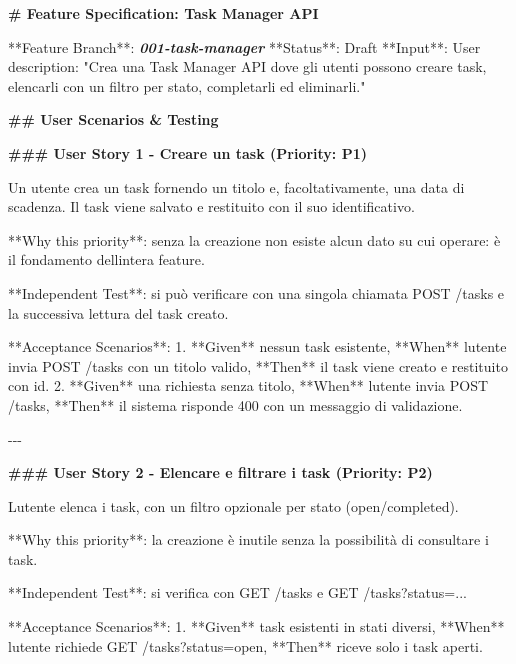 \documentclass[
  italian,
  10pt,
]{book}
\newenvironment{Shaded}{\begin{snugshade}}{\end{snugshade}}
\newcommand{\FunctionTok}[1]{\textcolor[rgb]{0.13,0.29,0.53}{\textbf{#1}}}
\newcommand{\InformationTok}[1]{\textcolor[rgb]{0.56,0.35,0.01}{\textbf{\textit{#1}}}}
\newcommand{\NormalTok}[1]{#1}
\newcommand{\SpecialStringTok}[1]{\textcolor[rgb]{0.31,0.60,0.02}{#1}}
\begin{document}
\begin{Shaded}
\begin{Highlighting}[]
\FunctionTok{\# Feature Specification: Task Manager API}

\NormalTok{**Feature Branch**: }\InformationTok{\textasciigrave{}001{-}task{-}manager\textasciigrave{}}
\NormalTok{**Status**: Draft}
\NormalTok{**Input**: User description: "Crea una Task Manager API dove gli utenti}
\NormalTok{possono creare task, elencarli con un filtro per stato, completarli ed}
\NormalTok{eliminarli."}

\FunctionTok{\#\# User Scenarios \& Testing}

\FunctionTok{\#\#\# User Story 1 {-} Creare un task (Priority: P1)}

\NormalTok{Un utente crea un task fornendo un titolo e, facoltativamente, una data di}
\NormalTok{scadenza. Il task viene salvato e restituito con il suo identificativo.}

\NormalTok{**Why this priority**: senza la creazione non esiste alcun dato su cui}
\NormalTok{operare: è il fondamento dell\textquotesingle{}intera feature.}

\NormalTok{**Independent Test**: si può verificare con una singola chiamata}
\NormalTok{POST /tasks e la successiva lettura del task creato.}

\NormalTok{**Acceptance Scenarios**:}
\SpecialStringTok{1. }\NormalTok{**Given** nessun task esistente, **When** l\textquotesingle{}utente invia POST /tasks}
\NormalTok{   con un titolo valido, **Then** il task viene creato e restituito con id.}
\SpecialStringTok{2. }\NormalTok{**Given** una richiesta senza titolo, **When** l\textquotesingle{}utente invia POST /tasks,}
\NormalTok{   **Then** il sistema risponde 400 con un messaggio di validazione.}

\NormalTok{{-}{-}{-}}

\FunctionTok{\#\#\# User Story 2 {-} Elencare e filtrare i task (Priority: P2)}

\NormalTok{L\textquotesingle{}utente elenca i task, con un filtro opzionale per stato (open/completed).}

\NormalTok{**Why this priority**: la creazione è inutile senza la possibilità di}
\NormalTok{consultare i task.}

\NormalTok{**Independent Test**: si verifica con GET /tasks e GET /tasks?status=...}

\NormalTok{**Acceptance Scenarios**:}
\SpecialStringTok{1. }\NormalTok{**Given** task esistenti in stati diversi, **When** l\textquotesingle{}utente richiede}
\NormalTok{   GET /tasks?status=open, **Then** riceve solo i task aperti.}


\end{Highlighting}
\end{Shaded}
\end{document}
